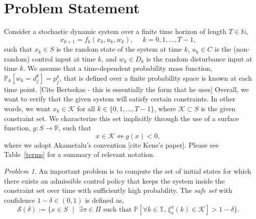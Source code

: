 \documentclass[letterpaper, 10 pt, conference]{ieeeconf}  %
\begin{document}

\section{Problem Statement}
Consider a stochastic dynamic system over a finite time horizon of length $T \in \mathbb{N}$,
\begin{equation}
x_{k+1} = f_k(x_k,u_k,w_k), \text{ }\text{ } k = 0, 1, \dots, T-1,
\end{equation}
such that $x_k \in S$ is the random state of the system at time $k$,
$u_k \in C$ is the (non-random) control input at time $k$, and
$w_k \in D_k$ is the random disturbance input at time $k$.
We assume that a time-dependent probability mass function, $\mathbb{P}_k[w_k = d_j^k] = p_j^k$,
that is defined over a finite probability space is known at each time point. [Cite Bertsekas - this is essentially the form that he uses]
Overall, we want to verify that the given system will satisfy certain constraints. 
In other words, we want $x_k \in \mathcal{K}$ for all $k \in \{0, 1, \dots, T-1\}$, where $\mathcal{K}\subset S$ is the given constraint set.
We characterize this set implicitly through the use of a surface function, $g : S \rightarrow \mathbb{R}$, such that
\begin{equation}
x \in \mathcal{K} \iff g(x) < 0,
\end{equation} 
where we adopt Akametalu's convention [cite Kene's paper]. Please see Table~\ref{terms} for a summary of relevant notation.

\textit{Problem 1}. An important problem is to compute the set of initial states for which there exists an admissible control policy that keeps
the system inside the constraint set over time with sufficiently high probability. The \textit{safe set} with confidence $1-\delta \in (0,1)$ is defined as,
\begin{equation}
\mathcal{S}(\delta) := \{ x \in S\text{ }|\text{ } \exists \pi \in \Pi \text{ such that } \mathbb{P}[ \forall k \in \mathbb{T}\text{, } \xi_x^\pi(k)\in \mathcal{K}] > 1-\delta \}.
\end{equation}
\end{document}
